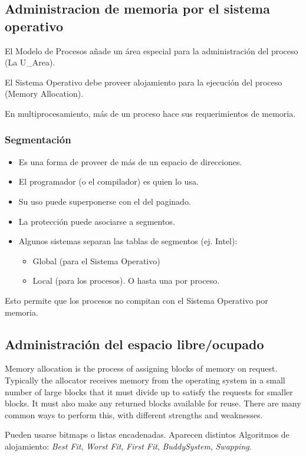 \documentclass[a4paper, twoside]{article}
\begin{document}
\subsection{Administracion de memoria por el sistema operativo}
El Modelo de Procesos añade un área especial para la administración del proceso (La U\_Area).

El Sistema Operativo debe proveer alojamiento para la ejecución del proceso (Memory Allocation).

En multiprocesamiento, más de un proceso hace sus requerimientos de memoria.

\subsubsection{Segmentación}
\begin{itemize}
	\item Es una forma de proveer de más de un espacio de direcciones.
	\item El programador (o el compilador) es quien lo usa.
	\item Su uso puede superponerse con el del paginado.
	\item La protección puede asociarse a segmentos.
	\item Algunos sistemas separan las tablas de segmentos (ej. Intel):
	\begin{itemize}
		\item Global (para el Sistema Operativo)
		\item Local (para los procesos). O hasta una por proceso.
	\end{itemize}
\end{itemize}
Esto permite que los procesos no compitan con el Sistema Operativo por memoria.

\subsection{Administración del espacio libre/ocupado}
Memory allocation is the process of assigning blocks of memory on request. Typically the allocator receives memory from the operating system in a small number of large blocks that it must divide up to satisfy the requests for smaller blocks. It must also make any returned blocks available for reuse. There are many common ways to perform this, with different strengths and weaknesses.

Pueden usarse bitmaps o listas encadenadas. Aparecen distintos Algoritmos de alojamiento: \emph{Best Fit}, \emph{Worst Fit}, \emph{First Fit}, \emph{BuddySystem}, \emph{Swapping}.
\end{document}
